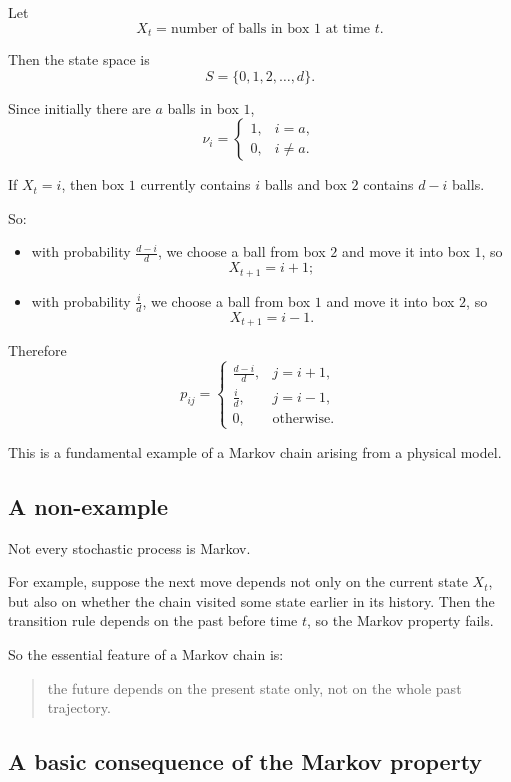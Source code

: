 \documentclass[11pt]{article}
\theoremstyle{definition}
\begin{document}
Let
\[
X_t=\text{number of balls in box \(1\) at time } t.
\]

Then the state space is
\[
S=\{0,1,2,\dots,d\}.
\]

Since initially there are \(a\) balls in box \(1\),
\[
\nu_i=
\begin{cases}
1, & i=a,\\
0, & i\ne a.
\end{cases}
\]

If \(X_t=i\), then box \(1\) currently contains \(i\) balls and box \(2\) contains \(d-i\) balls.

So:
\begin{itemize}[leftmargin=2em]
    \item with probability \(\frac{d-i}{d}\), we choose a ball from box \(2\) and move it into box \(1\), so
    \[
    X_{t+1}=i+1;
    \]
    \item with probability \(\frac{i}{d}\), we choose a ball from box \(1\) and move it into box \(2\), so
    \[
    X_{t+1}=i-1.
    \]
\end{itemize}

Therefore
\[
p_{ij}=
\begin{cases}
\frac{d-i}{d}, & j=i+1,\\[0.4em]
\frac{i}{d}, & j=i-1,\\[0.4em]
0, & \text{otherwise.}
\end{cases}
\]

This is a fundamental example of a Markov chain arising from a physical model.

\subsection{A non-example}

Not every stochastic process is Markov.

For example, suppose the next move depends not only on the current state \(X_t\), but also on whether the chain visited some state earlier in its history. Then the transition rule depends on the past before time \(t\), so the Markov property fails.

So the essential feature of a Markov chain is:
\begin{quote}
the future depends on the present state only, not on the whole past trajectory.
\end{quote}

\subsection{A basic consequence of the Markov property}
\end{document}
